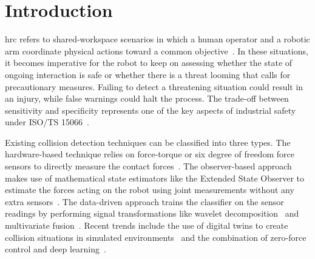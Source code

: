 \documentclass[pdflatex,sn-basic]{sn-jnl}%
\begin{document}
\maketitle


\section{Introduction}\label{sec:introduction}

\Ac{hrc} refers to shared-workspace scenarios in which a human operator and a robotic arm coordinate physical actions toward a common objective~\cite{selvaggio2021autonomy}. In these situations, it becomes imperative for the robot to keep on assessing whether the state of ongoing interaction is safe or whether there is a threat looming that calls for precautionary measures. Failing to detect a threatening situation could result in an injury, while false warnings could halt the process. The trade-off between sensitivity and specificity represents one of the key aspects of industrial safety under ISO/TS 15066~\cite{iso15066}.

Existing collision detection techniques can be classified into three types. The hardware-based technique relies on force-torque or six degree of freedom force sensors to directly measure the contact forces~\cite{wang2025sixdof}. The observer-based approach makes use of mathematical state estimators like the Extended State Observer to estimate the forces acting on the robot using joint measurements without any extra sensors~\cite{tonti2024eso}. The data-driven approach trains the classifier on the sensor readings by performing signal transformations like wavelet decomposition~\cite{niu2024wavelet} and multivariate fusion~\cite{fang2024multivariate}. Recent trends include the use of digital twins to create collision situations in simulated environments~\cite{an2024digitaltwin} and the combination of zero-force control and deep learning~\cite{zhao2025zeroforce}.
\end{document}
